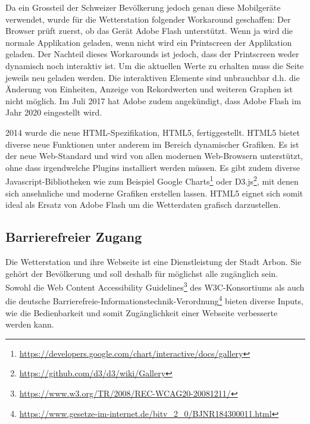 Da ein Grossteil der Schweizer Bevölkerung jedoch genau diese Mobilgeräte verwendet, wurde für die Wetterstation folgender Workaround geschaffen: Der Browser prüft zuerst, ob das Gerät Adobe Flash unterstützt. Wenn ja wird die normale Applikation geladen, wenn nicht wird ein Printscreen der Applikation geladen. Der Nachteil dieses Workarounds ist jedoch, dass der Printscreen weder dynamisch noch interaktiv ist. Um die aktuellen Werte zu erhalten muss die Seite jeweils neu geladen werden. Die interaktiven Elemente sind unbrauchbar d.h. die Änderung von Einheiten, Anzeige von Rekordwerten und weiteren Graphen ist nicht möglich. Im Juli 2017 hat Adobe zudem angekündigt, dass Adobe Flash im Jahr 2020 eingestellt wird\cite{Adobe:FlashTheFutureofInteractiveContent}.
\newline

\noindent
2014 wurde die neue HTML-Spezifikation, HTML5, fertiggestellt. HTML5 bietet diverse neue Funktionen unter anderem im Bereich dynamischer Grafiken. Es ist der neue Web-Standard und wird von allen modernen Web-Browsern unterstützt, ohne dass irgendwelche Plugins installiert werden müssen. Es gibt zudem diverse Javascript-Bibliotheken wie zum Beispiel Google Charts\footnote{ \url{https://developers.google.com/chart/interactive/docs/gallery}} oder D3.js\footnote{ \url{https://github.com/d3/d3/wiki/Gallery}}, mit denen sich ansehnliche und moderne Grafiken erstellen lassen. HTML5 eignet sich somit ideal als Ersatz von Adobe Flash um die Wetterdaten grafisch darzustellen. 


\subsection{Barrierefreier Zugang}
Die Wetterstation und ihre Webseite ist eine Dienstleistung der Stadt Arbon. Sie gehört der Bevölkerung und soll deshalb für möglichst alle zugänglich sein. Sowohl die \flqq Web Content Accessibility Guidelines\frqq\footnote{ \url{https://www.w3.org/TR/2008/REC-WCAG20-20081211/}} des W3C-Konsortiums als auch die deutsche \flqq  Barrierefreie-Informationstechnik-Verordnung\frqq\footnote{ \url{https://www.gesetze-im-internet.de/bitv_2_0/BJNR184300011.html}} bieten diverse Inputs, wie die Bedienbarkeit und somit Zugänglichkeit einer Webseite verbesserte werden kann. 
\newline

